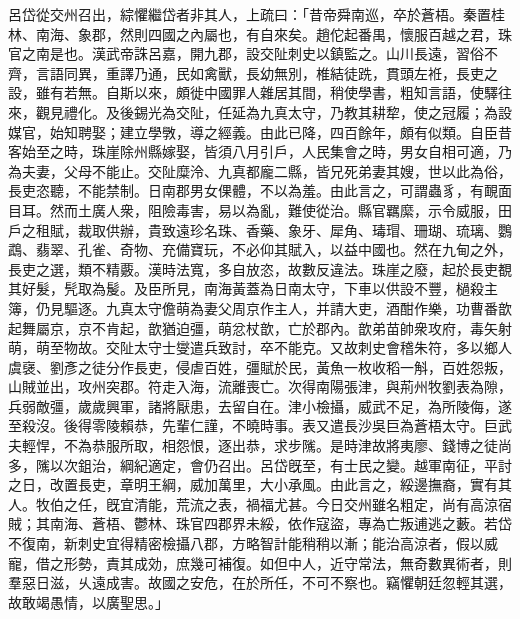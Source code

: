 \begin{pinyinscope}
 
 呂岱從交州召出，綜懼繼岱者非其人，上疏曰：「昔帝舜南巡，卒於蒼梧。秦置桂林、南海、象郡，然則四國之內屬也，有自來矣。趙佗起番禺，懷服百越之君，珠官之南是也。漢武帝誅呂嘉，開九郡，設交阯刺史以鎮監之。山川長遠，習俗不齊，言語同異，重譯乃通，民如禽獸，長幼無別，椎結徒跣，貫頭左袵，長吏之設，雖有若無。自斯以來，頗徙中國罪人雜居其間，稍使學書，粗知言語，使驛往來，觀見禮化。及後錫光為交阯，任延為九真太守，乃教其耕犂，使之冠履；為設媒官，始知聘娶；建立學斆，導之經義。由此已降，四百餘年，頗有似類。自臣昔客始至之時，珠崖除州縣嫁娶，皆須八月引戶，人民集會之時，男女自相可適，乃為夫妻，父母不能止。交阯糜泠、九真都龐二縣，皆兄死弟妻其嫂，世以此為俗，長吏恣聽，不能禁制。日南郡男女倮體，不以為羞。由此言之，可謂蟲豸，有靦面目耳。然而土廣人衆，阻險毒害，易以為亂，難使從治。縣官羈縻，示令威服，田戶之租賦，裁取供辦，貴致遠珍名珠、香藥、象牙、犀角、瑇瑁、珊瑚、琉璃、鸚鵡、翡翠、孔雀、奇物、充備寶玩，不必仰其賦入，以益中國也。然在九甸之外，長吏之選，類不精覈。漢時法寬，多自放恣，故數反違法。珠崖之廢，起於長吏覩其好髮，髠取為髲。及臣所見，南海黃蓋為日南太守，下車以供設不豐，檛殺主簿，仍見驅逐。九真太守儋萌為妻父周京作主人，并請大吏，酒酣作樂，功曹番歆起舞屬京，京不肯起，歆猶迫彊，萌忿杖歆，亡於郡內。歆弟苗帥衆攻府，毒矢射萌，萌至物故。交阯太守士燮遣兵致討，卒不能克。又故刺史會稽朱符，多以鄉人虞襃、劉彥之徒分作長吏，侵虐百姓，彊賦於民，黃魚一枚收稻一斛，百姓怨叛，山賊並出，攻州突郡。符走入海，流離喪亡。次得南陽張津，與荊州牧劉表為隙，兵弱敵彊，歲歲興軍，諸將厭患，去留自在。津小檢攝，威武不足，為所陵侮，遂至殺沒。後得零陵賴恭，先輩仁謹，不曉時事。表又遣長沙吳巨為蒼梧太守。巨武夫輕悍，不為恭服所取，相怨恨，逐出恭，求步隲。是時津故將夷廖、錢博之徒尚多，隲以次鉏治，綱紀適定，會仍召出。呂岱旣至，有士民之變。越軍南征，平討之日，改置長吏，章明王綱，威加萬里，大小承風。由此言之，綏邊撫裔，實有其人。牧伯之任，旣宜清能，荒流之表，禍福尤甚。今日交州雖名粗定，尚有高涼宿賊；其南海、蒼梧、鬱林、珠官四郡界未綏，依作寇盜，專為亡叛逋逃之藪。若岱不復南，新刺史宜得精密檢攝八郡，方略智計能稍稍以漸；能治高涼者，假以威寵，借之形勢，責其成効，庶幾可補復。如但中人，近守常法，無奇數異術者，則羣惡日滋，乆遠成害。故國之安危，在於所任，不可不察也。竊懼朝廷忽輕其選，故敢竭愚情，以廣聖思。」
 
 
 

\end{pinyinscope}
